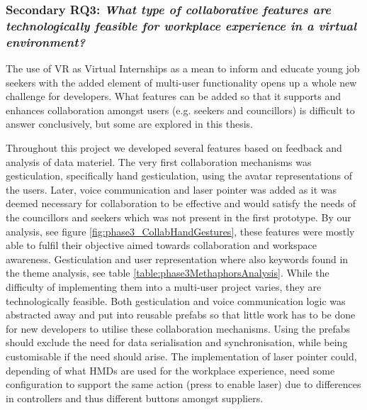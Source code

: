 





\subsubsection{Secondary RQ3: \textit{What type of collaborative features are technologically feasible for workplace experience in a virtual environment?}} 
\label{discussion:RQ3}

The use of VR as Virtual Internships as a mean to inform and educate young job seekers with the added element of multi-user functionality opens up a whole new challenge for developers. What features can be added so that it supports and enhances collaboration amongst users (e.g. seekers and councillors) is difficult to answer conclusively, but some are explored in this thesis.

Throughout this project we developed several features based on feedback and analysis of data materiel. The very first collaboration mechanisms was gesticulation, specifically hand gesticulation, using the avatar representations of the users. Later, voice communication and laser pointer was added as it was deemed necessary for collaboration to be effective and would satisfy the needs of the councillors and seekers which was not present in the first prototype. By our analysis, see figure \ref{fig:phase3_CollabHandGestures}, these features were mostly able to fulfil their objective aimed towards collaboration and workspace awareness. Gesticulation and user representation where also keywords found in the theme analysis, see table \ref{table:phase3MethaphorsAnalysis}.
While the difficulty of implementing them into a multi-user project varies, they are technologically feasible. Both gesticulation and voice communication logic was abstracted away and put into reusable prefabs so that little work has to be done for new developers to utilise these collaboration mechanisms. Using the prefabs should exclude the need for data serialisation and synchronisation, while being customisable if the need should arise. 
The implementation of laser pointer could, depending of what HMDs are used for the workplace experience, need some configuration to support the same action (press to enable laser) due to differences in controllers and thus different buttons amongst suppliers.  

